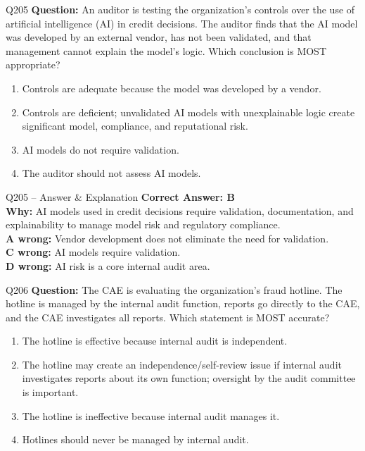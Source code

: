 \documentclass[aspectratio=169,10pt]{beamer}
\begin{document}
	\begin{frame}[t]{Q205}
		\small
		\textbf{Question:} An auditor is testing the organization's controls over the use of artificial intelligence (AI) in credit decisions. The auditor finds that the AI model was developed by an external vendor, has not been validated, and that management cannot explain the model's logic. Which conclusion is MOST appropriate?
		\begin{enumerate}[label=\Alph*.,itemsep=1pt,topsep=2pt]
			\item Controls are adequate because the model was developed by a vendor.
			\item Controls are deficient; unvalidated AI models with unexplainable logic create significant model, compliance, and reputational risk.
			\item AI models do not require validation.
			\item The auditor should not assess AI models.
		\end{enumerate}
	\end{frame}
	
	\begin{frame}[t]{Q205 -- Answer \& Explanation}
		\small
		\textbf{Correct Answer: B} \\[4pt]
		\textbf{Why:} AI models used in credit decisions require validation, documentation, and explainability to manage model risk and regulatory compliance. \\[4pt]
		\textbf{A wrong:} Vendor development does not eliminate the need for validation. \\[2pt]
		\textbf{C wrong:} AI models require validation. \\[2pt]
		\textbf{D wrong:} AI risk is a core internal audit area.
	\end{frame}
	
	\begin{frame}[t]{Q206}
		\small
		\textbf{Question:} The CAE is evaluating the organization's fraud hotline. The hotline is managed by the internal audit function, reports go directly to the CAE, and the CAE investigates all reports. Which statement is MOST accurate?
		\begin{enumerate}[label=\Alph*.,itemsep=1pt,topsep=2pt]
			\item The hotline is effective because internal audit is independent.
			\item The hotline may create an independence/self-review issue if internal audit investigates reports about its own function; oversight by the audit committee is important.
			\item The hotline is ineffective because internal audit manages it.
			\item Hotlines should never be managed by internal audit.
		\end{enumerate}
	\end{frame}
	
\end{document}
